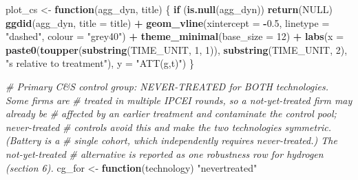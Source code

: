 \documentclass[
]{article}
\newenvironment{Shaded}{\begin{snugshade}}{\end{snugshade}}
\newcommand{\AttributeTok}[1]{\textcolor[rgb]{0.13,0.29,0.53}{#1}}
\newcommand{\CommentTok}[1]{\textcolor[rgb]{0.56,0.35,0.01}{\textit{#1}}}
\newcommand{\ConstantTok}[1]{\textcolor[rgb]{0.56,0.35,0.01}{#1}}
\newcommand{\ControlFlowTok}[1]{\textcolor[rgb]{0.13,0.29,0.53}{\textbf{#1}}}
\newcommand{\DecValTok}[1]{\textcolor[rgb]{0.00,0.00,0.81}{#1}}
\newcommand{\FloatTok}[1]{\textcolor[rgb]{0.00,0.00,0.81}{#1}}
\newcommand{\FunctionTok}[1]{\textcolor[rgb]{0.13,0.29,0.53}{\textbf{#1}}}
\newcommand{\NormalTok}[1]{#1}
\newcommand{\OtherTok}[1]{\textcolor[rgb]{0.56,0.35,0.01}{#1}}
\newcommand{\SpecialCharTok}[1]{\textcolor[rgb]{0.81,0.36,0.00}{\textbf{#1}}}
\newcommand{\StringTok}[1]{\textcolor[rgb]{0.31,0.60,0.02}{#1}}
\begin{document}
\begin{Shaded}
\begin{Highlighting}[]
\NormalTok{plot\_cs }\OtherTok{\textless{}{-}} \ControlFlowTok{function}\NormalTok{(agg\_dyn, title) \{}
  \ControlFlowTok{if}\NormalTok{ (}\FunctionTok{is.null}\NormalTok{(agg\_dyn)) }\FunctionTok{return}\NormalTok{(}\ConstantTok{NULL}\NormalTok{)}
  \FunctionTok{ggdid}\NormalTok{(agg\_dyn, }\AttributeTok{title =}\NormalTok{ title) }\SpecialCharTok{+}
    \FunctionTok{geom\_vline}\NormalTok{(}\AttributeTok{xintercept =} \SpecialCharTok{{-}}\FloatTok{0.5}\NormalTok{, }\AttributeTok{linetype =} \StringTok{"dashed"}\NormalTok{, }\AttributeTok{colour =} \StringTok{"grey40"}\NormalTok{) }\SpecialCharTok{+}
    \FunctionTok{theme\_minimal}\NormalTok{(}\AttributeTok{base\_size =} \DecValTok{12}\NormalTok{) }\SpecialCharTok{+}
    \FunctionTok{labs}\NormalTok{(}\AttributeTok{x =} \FunctionTok{paste0}\NormalTok{(}\FunctionTok{toupper}\NormalTok{(}\FunctionTok{substring}\NormalTok{(TIME\_UNIT, }\DecValTok{1}\NormalTok{, }\DecValTok{1}\NormalTok{)),}
                    \FunctionTok{substring}\NormalTok{(TIME\_UNIT, }\DecValTok{2}\NormalTok{), }\StringTok{"s relative to treatment"}\NormalTok{),}
         \AttributeTok{y =} \StringTok{"ATT(g,t)"}\NormalTok{)}
\NormalTok{\}}

\CommentTok{\# Primary C\&S control group: NEVER{-}TREATED for BOTH technologies. Some firms are}
\CommentTok{\# treated in multiple IPCEI rounds, so a not{-}yet{-}treated firm may already be}
\CommentTok{\# affected by an earlier treatment and contaminate the control pool; never{-}treated}
\CommentTok{\# controls avoid this and make the two technologies symmetric. (Battery is a}
\CommentTok{\# single cohort, which independently requires never{-}treated.) The not{-}yet{-}treated}
\CommentTok{\# alternative is reported as one robustness row for hydrogen (section 6).}
\NormalTok{cg\_for }\OtherTok{\textless{}{-}} \ControlFlowTok{function}\NormalTok{(technology) }\StringTok{"nevertreated"}


\end{Highlighting}
\end{Shaded}
\end{document}
